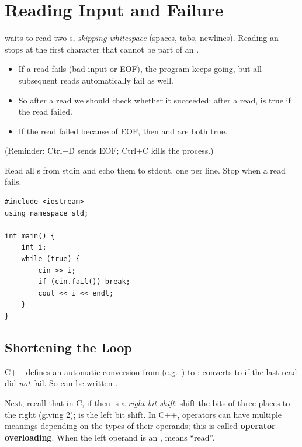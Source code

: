 \section{Reading Input and Failure}
 waits to read two s, \emph{skipping whitespace}
(spaces, tabs, newlines). Reading an  stops at the first character that
cannot be part of an .

\begin{itemize}
  \item If a read fails (bad input or EOF), the program keeps going, but all
        subsequent reads automatically fail as well.
  \item So after a read we should check whether it succeeded: after a read,
         is true if the read failed.
  \item If the read failed because of EOF, then  and
         are both true.
\end{itemize}
(Reminder: Ctrl+D sends EOF; Ctrl+C kills the process.)

\begin{example}
Read all s from stdin and echo them to stdout, one per line. Stop when
a read fails.
\begin{lstlisting}[style=cpp]
#include <iostream>
using namespace std;

int main() {
    int i;
    while (true) {
        cin >> i;
        if (cin.fail()) break;
        cout << i << endl;
    }
}
\end{lstlisting}
\end{example}

\subsection{Shortening the Loop}
C++ defines an automatic conversion from  (e.g.\ ) to
:  converts to  if the last read did
\emph{not} fail. So  can be written .

Next, recall that in C, if  then  is a
\emph{right bit shift}: shift the bits of  three places to the right
(giving 2); \code{<<} is the left bit shift. In C++, operators can have multiple
meanings depending on the types of their operands; this is called
\textbf{operator overloading}. When the left operand is an ,
\code{>>} means ``read''.

